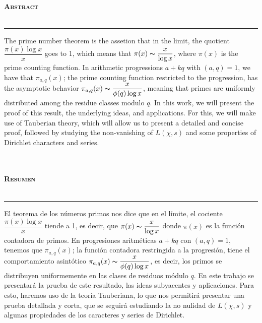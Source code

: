 
\thispagestyle{empty}
\vspace*{4cm}
\begin{Huge}
    \bfseries \selectfont \hfill \scshape Abstract\\\\
    \rule[0.5ex]{\linewidth}{1pt}
\end{Huge}

The prime number theorem is the assetion that in the limit, the quotient $\dfrac{\pi(x)\log x}{x}$ goes to 1, which means that $\pi(x)\thicksim \dfrac{x}{\log x}$, where $\pi(x)$ is the prime counting function. In arithmetic progressions $a+kq$ with $(a,q)=1$, we have that $\pi_{a,q}(x)$; the prime counting function restricted to the progression, has the asymptotic behavior $\pi_{a,q}(x)\thicksim \dfrac{x}{\phi(q)\log x}$, meaning that primes are uniformly distributed among the residue classes modulo $q$. In this work, we will present the proof of this result, the underlying ideas, and applications. For this, we will make use of Tauberian theory, which will allow us to present a detailed and concise proof, followed by studying the non-vanishing of $L(\chi,s)$ and some properties of Dirichlet characters and series.\\\\\\

\begin{Huge}
    \bfseries \selectfont \scshape Resumen\\\\
    \rule[0.5ex]{\linewidth}{1pt}
\end{Huge}

El teorema de los números primos nos dice que en el límite, el cociente $\dfrac{\pi(x)\log x}{x}$ tiende a 1, es decir, que $\pi(x)\thicksim \dfrac{x}{\log x}$ donde $\pi(x)$ es la función contadora de primos. En progresiones aritméticas $a+kq$ con $(a,q)=1$, tenemos que $\pi_{a,q}(x)$; la función contadora restringida a la progresión, tiene el comportamiento asintótico $\pi_{a,q}(x)\thicksim \dfrac{x}{\phi(q)\log x}$, es decir, los primos se distribuyen uniformemente en las clases de residuos módulo $q$. En este trabajo se presentará la prueba de este resultado, las ideas subyacentes y aplicaciones. Para esto, haremos uso de la teoría Tauberiana, lo que nos permitirá presentar una prueba detallada y corta, que se seguirá estudiando la no nulidad de $L(\chi,s)$ y algunas propiedades de los caracteres y series de Dirichlet.